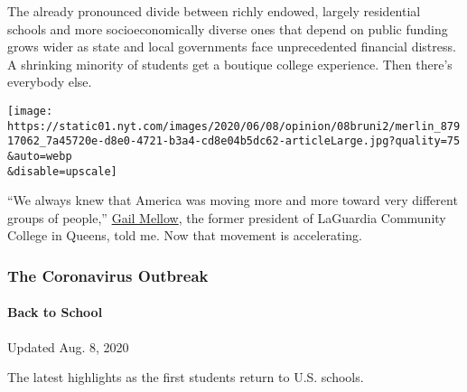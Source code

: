 The already pronounced divide between richly endowed, largely
residential schools and more socioeconomically diverse ones that depend
on public funding grows wider as state and local governments face
unprecedented financial distress. A shrinking minority of students get a
boutique college experience. Then there's everybody else.

\texttt{[image: https://static01.nyt.com/images/2020/06/08/opinion/08bruni2/merlin\_87917062\_7a45720e-d8e0-4721-b3a4-cd8e04b5dc62-articleLarge.jpg?quality=75\\\&auto=webp\\\&disable=upscale]}

``We always knew that America was moving more and more toward very
different groups of people,''
\href{https://www.suny.edu/sunycon/2016/speakers/gail-mellow/}{Gail
Mellow}, the former president of LaGuardia Community College in Queens,
told me. Now that movement is accelerating.

\hypertarget{the-coronavirus-outbreak}{%
\subsubsection{The Coronavirus
Outbreak}\label{the-coronavirus-outbreak}}

\hypertarget{back-to-school}{%
\paragraph{Back to School}\label{back-to-school}}

Updated Aug. 8, 2020

The latest highlights as the first students return to U.S. schools.

